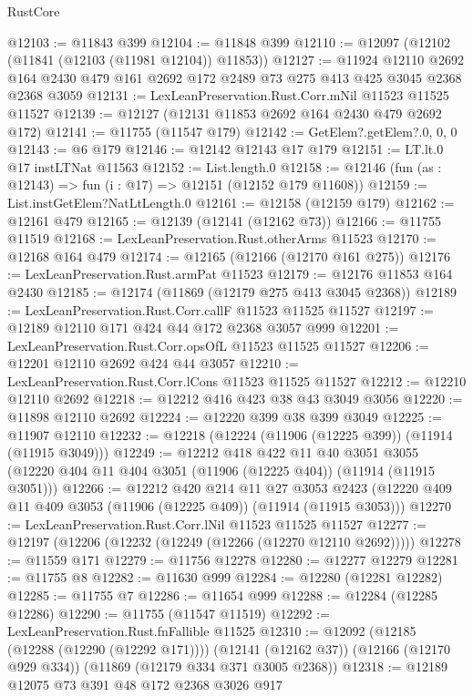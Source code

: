 \begin{lexlean}{RustCore}
\begin{coremodule}
@12103 := @11843 @399
@12104 := @11848 @399
@12110 := @12097 (@12102 (@11841 (@12103 (@11981 @12104)) @11853))
@12127 := @11924
    @12110
    @2692
    @164
    @2430
    @479
    @161
    @2692
    @172
    @2489
    @73
    @275
    @413
    @425
    @3045
    @2368
    @2368
    @3059
@12131 := LexLeanPreservation.Rust.Corr.mNil @11523 @11525 @11527
@12139 := @12127 (@12131 @11853 @2692 @164 @2430 @479 @2692 @172)
@12141 := @11755 (@11547 @179)
@12142 := GetElem?.getElem?.{0, 0, 0}
@12143 := @6 @179
@12146 := @12142 @12143 @17 @179
@12151 := LT.lt.{0} @17 instLTNat @11563
@12152 := List.length.{0}
@12158 := @12146 (fun (as : @12143) => fun (i : @17) => @12151 (@12152 @179 @11608))
@12159 := List.instGetElem?NatLtLength.{0}
@12161 := @12158 (@12159 @179)
@12162 := @12161 @479
@12165 := @12139 (@12141 (@12162 @73))
@12166 := @11755 @11519
@12168 := LexLeanPreservation.Rust.otherArms @11523
@12170 := @12168 @164 @479
@12174 := @12165 (@12166 (@12170 @161 @275))
@12176 := LexLeanPreservation.Rust.armPat @11523
@12179 := @12176 @11853 @164 @2430
@12185 := @12174 (@11869 (@12179 @275 @413 @3045 @2368))
@12189 := LexLeanPreservation.Rust.Corr.callF @11523 @11525 @11527
@12197 := @12189 @12110 @171 @424 @44 @172 @2368 @3057 @999
@12201 := LexLeanPreservation.Rust.Corr.opsOfL @11523 @11525 @11527
@12206 := @12201 @12110 @2692 @424 @44 @3057
@12210 := LexLeanPreservation.Rust.Corr.lCons @11523 @11525 @11527
@12212 := @12210 @12110 @2692
@12218 := @12212 @416 @423 @38 @43 @3049 @3056
@12220 := @11898 @12110 @2692
@12224 := @12220 @399 @38 @399 @3049
@12225 := @11907 @12110
@12232 := @12218 (@12224 (@11906 (@12225 @399)) (@11914 (@11915 @3049)))
@12249 := @12212
    @418
    @422
    @11
    @40
    @3051
    @3055
    (@12220 @404 @11 @404 @3051 (@11906 (@12225 @404)) (@11914 (@11915 @3051)))
@12266 := @12212
    @420
    @214
    @11
    @27
    @3053
    @2423
    (@12220 @409 @11 @409 @3053 (@11906 (@12225 @409)) (@11914 (@11915 @3053)))
@12270 := LexLeanPreservation.Rust.Corr.lNil @11523 @11525 @11527
@12277 := @12197 (@12206 (@12232 (@12249 (@12266 (@12270 @12110 @2692)))))
@12278 := @11559 @171
@12279 := @11756 @12278
@12280 := @12277 @12279
@12281 := @11755 @8
@12282 := @11630 @999
@12284 := @12280 (@12281 @12282)
@12285 := @11755 @7
@12286 := @11654 @999
@12288 := @12284 (@12285 @12286)
@12290 := @11755 (@11547 @11519)
@12292 := LexLeanPreservation.Rust.fnFallible @11525
@12310 := @12092
    (@12185 (@12288 (@12290 (@12292 @171))))
    (@12141 (@12162 @37))
    (@12166 (@12170 @929 @334))
    (@11869 (@12179 @334 @371 @3005 @2368))
@12318 := @12189 @12075 @73 @391 @48 @172 @2368 @3026 @917

\end{coremodule}
\end{lexlean}
